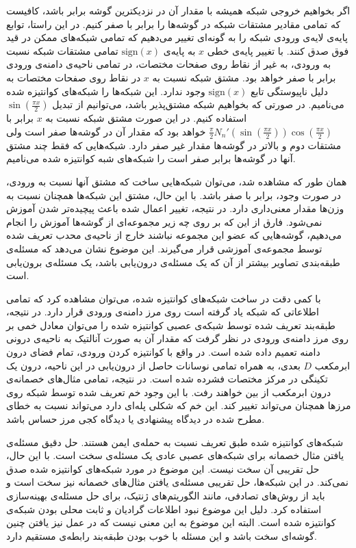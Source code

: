 \documentclass[12pt,onecolumn,a4paper]{article}
\begin{document}
اگر بخواهیم خروجی شبکه همیشه با مقدار آن در نزدیکترین گوشه برابر باشد، کافیست که تمامی مقادیر مشتقات شبکه در گوشه‌ها را برابر با صفر کنیم. در این راستا، توابع پایه‌ی لایه‌ی ورودی شبکه را به گونه‌ای تغییر می‌دهیم که تمامی شبکه‌های ممکن در قید فوق صدق کنند. با تغییر پایه‌ی خطی $x$ به پایه‌ی $\mathrm{sign}(x)$ تمامی مشتقات شبکه نسبت به ورودی، به غیر از نقاط روی صفحات مختصات، در تمامی ناحیه‌ی دامنه‌ی ورودی برابر با صفر خواهد بود. مشتق شبکه نسبت به $x$ در نقاط روی صفحات مختصات به دلیل ناپیوستگی تابع $\mathrm{sign}(x)$ وجود ندارد. این شبکه‌ها را شبکه‌های کوانتیزه شده می‌نامیم. در صورتی که بخواهیم شبکه مشتق‌پذیر باشد، می‌توانیم از تبدیل $\sin(\frac{\pi x}{2})$ استفاده کنیم. در این صورت مشتق شبکه نسبت به $x$ برابر با $\frac{\pi}{2}N_n'(\sin(\frac{\pi x}{2}))\cos(\frac{\pi x}{2})$ خواهد بود که مقدار آن در گوشه‌ها صفر است ولی مشتقات دوم و بالاتر در گوشه‌ها مقدار غیر صفر دارد. شبکه‌هایی که فقط چند مشتق آنها در گوشه‌ها برابر صفر است را شبکه‌های شبه کوانتیزه شده می‌نامیم.

همان طور که مشاهده شد، می‌توان شبکه‌هایی ساخت که مشتق آنها نسبت به ورودی، در صورت وجود، برابر با صفر باشد. با این حال، مشتق این شبکه‌ها همچنان نسبت به وزن‌ها مقدار معنی‌داری دارد. در نتیجه، تغییر اعمال شده باعث پیچیده‌تر شدن آموزش نمی‌شود. فارق از این که بر روی چه زیر مجموعه‌ای از گوشه‌ها آموزش را انجام می‌دهیم، گوشه‌هایی که عضو این مجموعه نباشند خارج از ناحیه‌ی محدب تعریف شده توسط مجموعه‌ی آموزشی قرار می‌گیرند. این موضوع نشان می‌دهد که مسئله‌ی طبقه‌بندی تصاویر بیشتر از آن که یک مسئله‌ی درون‌یابی باشد، یک مسئله‌ی برون‌یابی است.

با کمی دقت در ساخت شبکه‌های کوانتیزه شده، می‌توان مشاهده کرد که تمامی اطلاعاتی که شبکه یاد گرفته است روی مرز دامنه‌ی ورودی قرار دارد. در نتیجه، طبقه‌بند تعریف شده توسط شبکه‌ی عصبی کوانتیزه شده را می‌توان معادل خمی بر روی مرز دامنه‌ی ورودی در نظر گرفت که مقدار آن به صورت آنالتیک به ناحیه‌ی درونی دامنه تعمیم داده شده است. در واقع با کوانتیزه کردن ورودی، تمام فضای درون ابرمکعب $D$ بعدی، به همراه تمامی نوسانات حاصل از درون‌یابی در این ناحیه، درون یک تکینگی در مرکز مختصات فشرده شده است. در نتیجه، تمامی مثال‌های خصمانه‌ی درون ابرمکعب از بین خواهند رفت. با این وجود خم تعریف شده توسط شبکه روی مرزها همچنان می‌تواند تغییر کند. این خم که شکلی پله‌ای دارد می‌تواند نسبت به خطای مطرح شده در دیدگاه پیشنهادی یا دیدگاه کجی مرز حساس باشد.

شبکه‌های کوانتیزه شده طبق تعریف نسبت به حمله‌ی  ایمن هستند. حل دقیق مسئله‌ی یافتن مثال خصمانه برای شبکه‌های عصبی عادی یک مسئله‌ی سخت است\cite{szegedy2013intriguing}. با این حال، حل تقریبی آن سخت نیست. این موضوع در مورد شبکه‌های کوانتیزه شده صدق نمی‌کند. در این شبکه‌ها، حل تقریبی مسئله‌ی یافتن مثال‌های خصمانه نیز سخت است و باید از روش‌های تصادفی، مانند الگوریتم‌های ژنتیک، برای حل مسئله‌ی بهینه‌سازی استفاده کرد. دلیل این موضوع نبود اطلاعات گرادیان و ثابت محلی بودن  شبکه‌ی کوانتیزه شده است. البته این موضوع به این معنی نیست که در عمل نیز یافتن چنین گوشه‌ای سخت باشد و این مسئله با خوب بودن طبقه‌بند رابطه‌ی مستقیم دارد.
\end{document}
